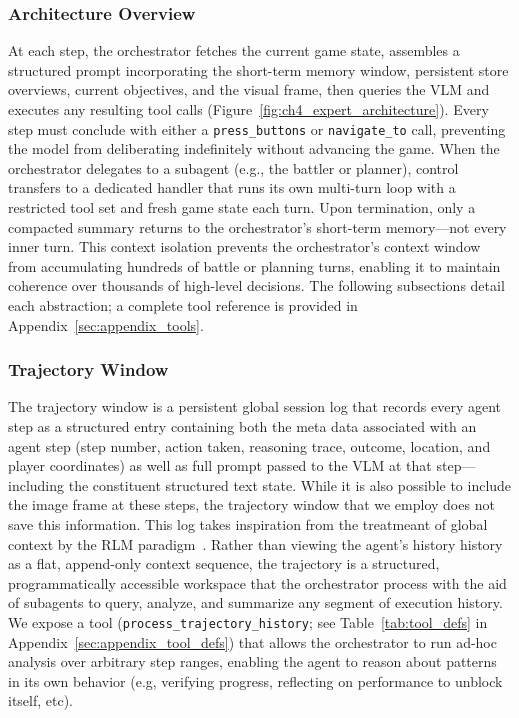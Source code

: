 \subsubsection{Architecture Overview}\label{sec:architecture_overview}

At each step, the orchestrator fetches the current game state, assembles a structured prompt incorporating the short-term memory window, persistent store overviews, current objectives, and the visual frame, then queries the VLM and executes any resulting tool calls (Figure~\ref{fig:ch4_expert_architecture}). Every step must conclude with either a \texttt{press\_buttons} or \texttt{navigate\_to} call, preventing the model from deliberating indefinitely without advancing the game. When the orchestrator delegates to a subagent (e.g., the battler or planner), control transfers to a dedicated handler that runs its own multi-turn loop with a restricted tool set and fresh game state each turn. Upon termination, only a compacted summary returns to the orchestrator's short-term memory---not every inner turn. This context isolation prevents the orchestrator's context window from accumulating hundreds of battle or planning turns, enabling it to maintain coherence over thousands of high-level decisions. The following subsections detail each abstraction; a complete tool reference is provided in Appendix~\ref{sec:appendix_tools}.

\subsubsection{Trajectory Window}\label{sec:trajectory_window}

The trajectory window is a persistent global session log that records every agent step as a structured entry containing both the meta data associated with an agent step (step number, action taken, reasoning trace, outcome, location, and player coordinates) as well as full prompt passed to the VLM at that step---including the constituent structured text state. While it is also possible to include the image frame at these steps, the trajectory window that we employ does not save this information. This log takes inspiration from the treatmeant of global context by the RLM paradigm~\citep{qu2024recursive}. Rather than viewing the agent's history history as a flat, append-only context sequence, the trajectory is a structured, programmatically accessible workspace that the orchestrator process with the aid of subagents to query, analyze, and summarize any segment of execution history. We expose a tool (\texttt{process\_trajectory\_history}; see Table~\ref{tab:tool_defs} in Appendix~\ref{sec:appendix_tool_defs}) that allows the orchestrator to run ad-hoc analysis over arbitrary step ranges, enabling the agent to reason about patterns in its own behavior (e.g, verifying progress, reflecting on performance to unblock itself, etc).

